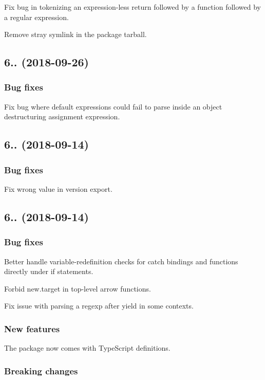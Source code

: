 Fix bug in tokenizing an expression-\/less return followed by a function followed by a regular expression.

Remove stray symlink in the package tarball.

\subsection*{6.. (2018-\/09-\/26)}

\subsubsection*{Bug fixes}

Fix bug where default expressions could fail to parse inside an object destructuring assignment expression.

\subsection*{6.. (2018-\/09-\/14)}

\subsubsection*{Bug fixes}

Fix wrong value in {\ttfamily version} export.

\subsection*{6.. (2018-\/09-\/14)}

\subsubsection*{Bug fixes}

Better handle variable-\/redefinition checks for catch bindings and functions directly under if statements.

Forbid {\ttfamily new.\+target} in top-\/level arrow functions.

Fix issue with parsing a regexp after {\ttfamily yield} in some contexts.

\subsubsection*{New features}

The package now comes with Type\+Script definitions.

\subsubsection*{Breaking changes}

